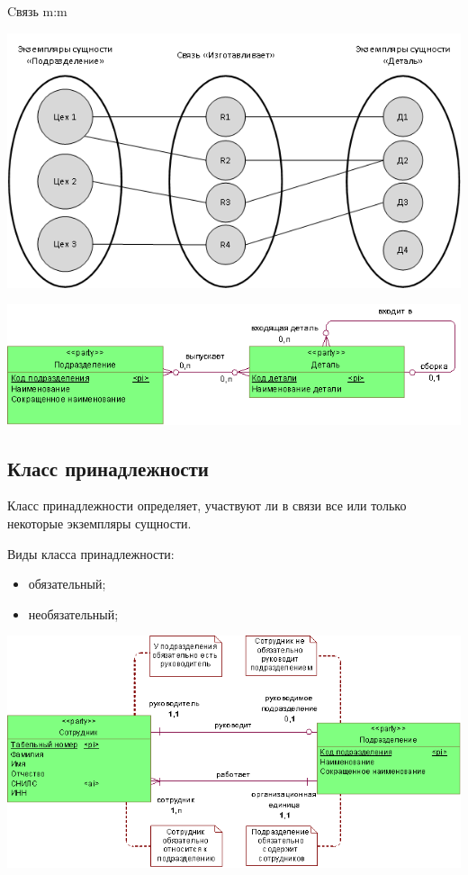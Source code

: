 \documentclass{beamer}
\begin{document}
\begin{frame}
\begin{block}{Cвязь m:m}
\begin{center}
\includegraphics[scale=0.5]{images/many-many.png}
\end{center}
\begin{center}
\includegraphics[scale=0.5]{images/many-many-er.png}
\end{center}
\end{block}
\end{frame}

\subsection{Класс принадлежности}
\begin{frame}
\begin{block}{Класс принадлежности}
определяет, участвуют ли в связи все или только некоторые экземпляры сущности.
\end{block}
Виды класса принадлежности:
\begin{itemize}
\item обязательный;
\item необязательный;
\end{itemize}
\begin{center}
\includegraphics[scale=0.5]{images/requery.png}
\end{center}
\end{frame}
\end{document}

